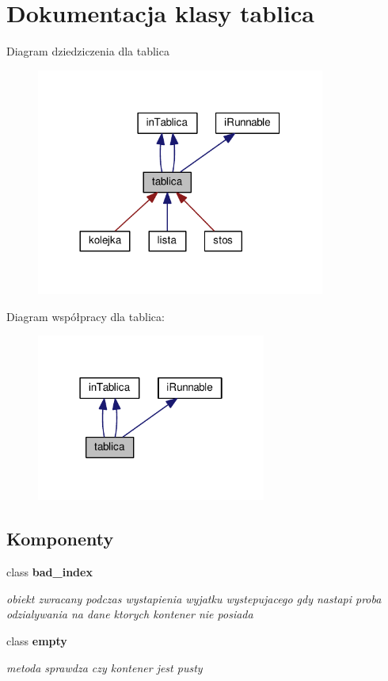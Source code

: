 \section{Dokumentacja klasy tablica}
\label{classtablica}


Diagram dziedziczenia dla tablica
\nopagebreak
\begin{figure}[H]
\begin{center}
\leavevmode
\includegraphics[width=269pt]{classtablica__inherit__graph}
\end{center}
\end{figure}


Diagram współpracy dla tablica\+:
\nopagebreak
\begin{figure}[H]
\begin{center}
\leavevmode
\includegraphics[width=214pt]{classtablica__coll__graph}
\end{center}
\end{figure}
\subsection*{Komponenty}
\begin{DoxyCompactItemize}
\item 
class {\bf bad\+\_\+index}
\begin{DoxyCompactList}\small\item\em obiekt zwracany podczas wystapienia wyjatku wystepujacego gdy nastapi proba odzialywania na dane ktorych kontener nie posiada \end{DoxyCompactList}\item 
class {\bf empty}
\begin{DoxyCompactList}\small\item\em metoda sprawdza czy kontener jest pusty \end{DoxyCompactList}\end{DoxyCompactItemize}
